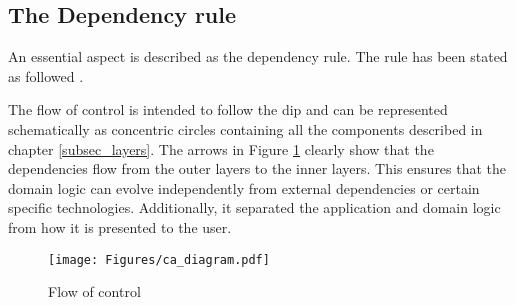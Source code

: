 \subsection{The Dependency rule} \label{sebsec:dependency_rule}

An essential aspect is described as the dependency rule. The rule has been stated as
followed \parencite[206]{robert_c_martin_clean_2018}.


The flow of control is intended to follow the \gls{dip} and can be represented
schematically as concentric circles containing all the components described in chapter
\ref{subsec_layers}. The arrows in Figure \ref{fig_modulair_components} clearly show that
the dependencies flow from the outer layers to the inner layers. This ensures that the
domain logic can evolve independently from external dependencies or certain specific
technologies. Additionally, it separated the application and domain logic from how it is
presented to the user. 

\begin{figure}[H]
    \centering
    \texttt{[image: Figures/ca\_diagram.pdf]}
    \caption[Flow of control]{Flow of control}
    \label{fig_modulair_components}
\end{figure}